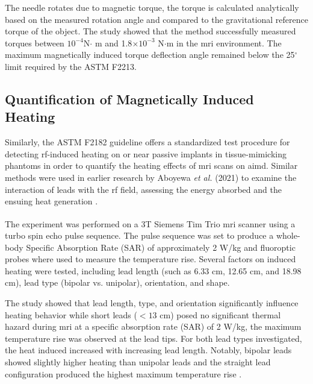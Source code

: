 The needle rotates due to magnetic torque, the torque is calculated analytically based on the measured rotation angle and compared to the gravitational reference torque of the object. The study showed that the method successfully measured torques between $10^{-4} $N$ \cdot$ m and 1.8$\times10^{-3}$ N$\cdot$m in the \gls{mri} environment. The maximum magnetically induced torque deflection angle remained below the 25$^\circ$ limit required by the ASTM F2213.


\subsection{Quantification of Magnetically Induced Heating}
\label{sec:rfpulses-heating}

Similarly, the ASTM F2182 guideline offers a standardized test procedure for detecting \gls{rf}-induced heating on or near passive implants in tissue-mimicking phantoms in order to quantify the heating effects of \gls{mri} scans on \gls{aimd}. Similar methods were used in earlier research by Aboyewa \textit{et al.} (2021) to examine the interaction of leads with the \gls{rf} field, assessing the energy absorbed and the ensuing heat generation \cite{aboyewa2021}.

The experiment was performed on a 3T Siemens Tim Trio\textsuperscript{\texttrademark}  \gls{mri}  scanner using a turbo spin echo pulse sequence. The pulse sequence was set to produce a whole-body Specific Absorption Rate (SAR) of approximately 2 W/kg and fluoroptic probes where used to measure the temperature rise. Several factors on induced heating were tested, including lead length (such as 6.33 cm, 12.65 cm, and 18.98 cm), lead type (bipolar vs. unipolar), orientation, and shape.

The study showed that lead length, type, and orientation significantly influence heating behavior while short leads ($<13$ cm) posed no significant thermal hazard during \gls{mri} at a specific absorption rate (SAR) of 2 W/kg, the maximum temperature rise was observed at the lead tips. For both lead types investigated, the heat induced increased with increasing lead length. Notably, bipolar leads showed slightly higher heating than unipolar leads and the straight lead configuration produced the highest maximum temperature rise \cite{aboyewa2021}.

